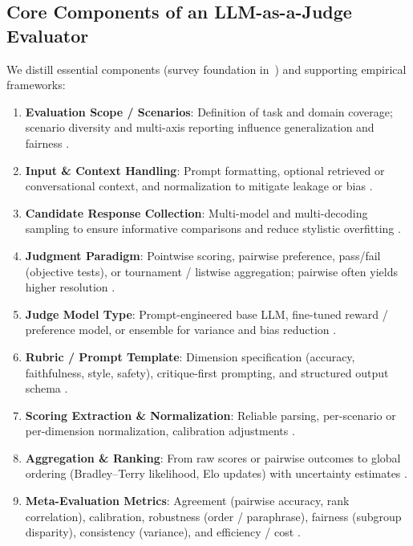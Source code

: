 \subsection{Core Components of an LLM-as-a-Judge Evaluator}
We distill essential components (survey foundation in~\cite{li2024_llmsasjudges}) and supporting empirical frameworks:
\begin{enumerate}
	\item \textbf{Evaluation Scope / Scenarios}: Definition of task and domain coverage; scenario diversity and multi-axis reporting influence generalization and fairness \cite{liang2022helm, srivastava2022bigbench}.
	\item \textbf{Input \& Context Handling}: Prompt formatting, optional retrieved or conversational context, and normalization to mitigate leakage or bias \cite{liang2022helm, hada2024metal}.
	\item \textbf{Candidate Response Collection}: Multi-model and multi-decoding sampling to ensure informative comparisons and reduce stylistic overfitting \cite{zheng2023judgelm, chen2021evaluating}.
	\item \textbf{Judgment Paradigm}: Pointwise scoring, pairwise preference, pass/fail (objective tests), or tournament / listwise aggregation; pairwise often yields higher resolution \cite{bradley1952rank, zheng2023judgelm, liu2024pairs, chen2021evaluating}.
	\item \textbf{Judge Model Type}: Prompt-engineered base LLM, fine-tuned reward / preference model, or ensemble for variance and bias reduction \cite{stiennon2020learning, ouyang2022training, bavaresco2024judgebench}.
	\item \textbf{Rubric / Prompt Template}: Dimension specification (accuracy, faithfulness, style, safety), critique-first prompting, and structured output schema \cite{fu2023gptscore, li2024_llmsasjudges}.
	\item \textbf{Scoring Extraction \& Normalization}: Reliable parsing, per-scenario or per-dimension normalization, calibration adjustments \cite{liang2022helm, bavaresco2024judgebench}.
	\item \textbf{Aggregation \& Ranking}: From raw scores or pairwise outcomes to global ordering (Bradley--Terry likelihood, Elo updates) with uncertainty estimates \cite{bradley1952rank, elo1978rating, zheng2023judgelm}.
	\item \textbf{Meta-Evaluation Metrics}: Agreement (pairwise accuracy, rank correlation), calibration, robustness (order / paraphrase), fairness (subgroup disparity), consistency (variance), and efficiency / cost \cite{bavaresco2024judgebench, hada2024metal, li2024_llmsasjudges}.

\end{enumerate}
